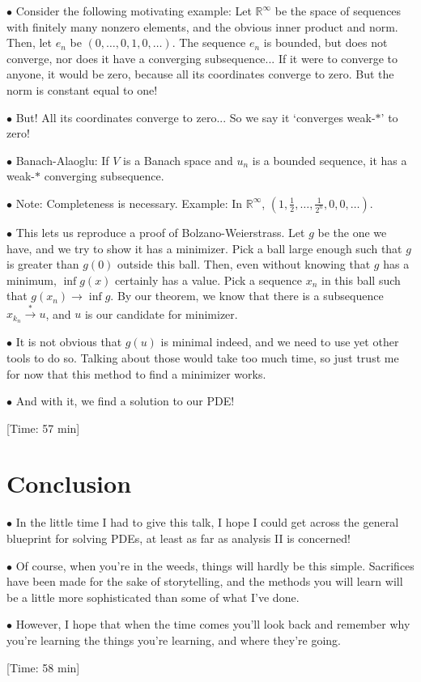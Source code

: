 \documentclass{article}
\newcommand{\R}{\mathbb{R}}
\newcommand\point[1]{\noindent \hspace{\labelsep} $\bullet$ #1 \smallskip}
\newcommand\timestamp[1]{\noindent \hspace{\labelsep} [Time: #1] \smallskip}
\begin{document}
\point{Consider the following motivating example: Let $\R^\infty$ be the space of sequences with finitely many nonzero elements, and the obvious inner product and norm. Then, let $e_n$ be $(0,\dots,0,1,0,\dots)$. The sequence $e_n$ is bounded, but does not converge, nor does it have a converging subsequence... If it were to converge to anyone, it would be zero, because all its coordinates converge to zero. But the norm is constant equal to one!}

\point{But! All its coordinates converge to zero... So we say it `converges weak-$*$' to zero!}

\point{Banach-Alaoglu: If $V$ is a Banach space and $u_n$ is a bounded sequence, it has a weak-$*$ converging subsequence.}

\point{Note: Completeness is necessary. Example: In $\R^\infty$, $(1,\frac12,\dots,\frac1{2^n},0,0,\dots)$.}

\point{This lets us reproduce a proof of Bolzano-Weierstrass. Let $g$ be the one we have, and we try to show it has a minimizer. Pick a ball large enough such that $g$ is greater than $g(0)$ outside this ball. Then, even without knowing that $g$ has a minimum, $\inf g(x)$ certainly has a value. Pick a sequence $x_n$ in this ball such that $g(x_n) \to \inf g$. By our theorem, we know that there is a subsequence $x_{k_n} \xrightarrow{*} u$, and $u$ is our candidate for minimizer.}

\point{It is not obvious that $g(u)$ is minimal indeed, and we need to use yet other tools to do so. Talking about those would take too much time, so just trust me for now that this method to find a minimizer works.}

\point{And with it, we find a solution to our PDE!}

\timestamp{57 min}

\section{Conclusion}

\point{In the little time I had to give this talk, I hope I could get across the general blueprint for solving PDEs, at least as far as analysis II is concerned!}

\point{Of course, when you're in the weeds, things will hardly be this simple. Sacrifices have been made for the sake of storytelling, and the methods you will learn will be a little more sophisticated than some of what I've done.}

\point{However, I hope that when the time comes you'll look back and remember why you're learning the things you're learning, and where they're going.}

\timestamp{58 min}
\end{document}
